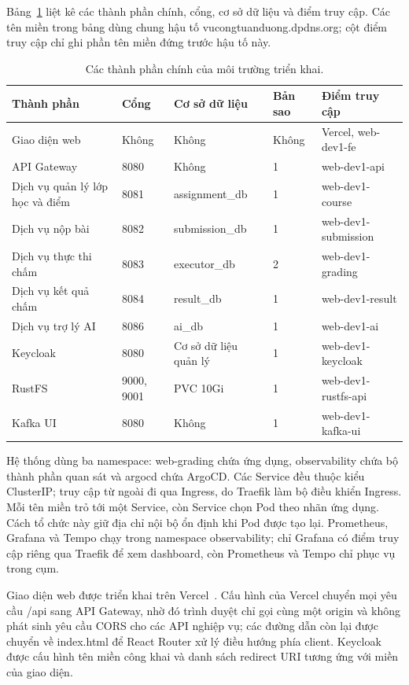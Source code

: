 \documentclass[../BTL.tex]{subfiles}
\begin{document}
Bảng~\ref{tab:deploy-components} liệt kê các thành phần chính, cổng, cơ sở dữ liệu và điểm truy cập. Các tên miền trong bảng dùng chung hậu tố vucongtuanduong.dpdns.org; cột điểm truy cập chỉ ghi phần tên miền đứng trước hậu tố này.

\begin{table}[H]
\centering
\footnotesize
\begin{tabularx}{\textwidth}{|p{3.1cm}|p{1.6cm}|p{3.2cm}|p{1.3cm}|X|}
\hline
Thành phần & Cổng & Cơ sở dữ liệu & Bản sao & Điểm truy cập \\ \hline
Giao diện web & Không & Không & Không & Vercel, web-dev1-fe \\ \hline
API Gateway & 8080 & Không & 1 & web-dev1-api \\ \hline
Dịch vụ quản lý lớp học và điểm & 8081 & assignment\_db & 1 & web-dev1-course \\ \hline
Dịch vụ nộp bài & 8082 & submission\_db & 1 & web-dev1-submission \\ \hline
Dịch vụ thực thi chấm & 8083 & executor\_db & 2 & web-dev1-grading \\ \hline
Dịch vụ kết quả chấm & 8084 & result\_db & 1 & web-dev1-result \\ \hline
Dịch vụ trợ lý AI & 8086 & ai\_db & 1 & web-dev1-ai \\ \hline
Keycloak & 8080 & Cơ sở dữ liệu quản lý & 1 & web-dev1-keycloak \\ \hline
RustFS & 9000, 9001 & PVC 10Gi & 1 & web-dev1-rustfs-api \\ \hline
Kafka UI & 8080 & Không & 1 & web-dev1-kafka-ui \\ \hline
\end{tabularx}
\caption{Các thành phần chính của môi trường triển khai.}
\label{tab:deploy-components}
\end{table}

Hệ thống dùng ba namespace: web-grading chứa ứng dụng, observability chứa bộ thành phần quan sát và argocd chứa ArgoCD. Các Service đều thuộc kiểu ClusterIP; truy cập từ ngoài đi qua Ingress, do Traefik làm bộ điều khiển Ingress. Mỗi tên miền trỏ tới một Service, còn Service chọn Pod theo nhãn ứng dụng. Cách tổ chức này giữ địa chỉ nội bộ ổn định khi Pod được tạo lại. Prometheus, Grafana và Tempo chạy trong namespace observability; chỉ Grafana có điểm truy cập riêng qua Traefik để xem dashboard, còn Prometheus và Tempo chỉ phục vụ trong cụm.

Giao diện web được triển khai trên Vercel~\cite{verceldocs}. Cấu hình của Vercel chuyển mọi yêu cầu /api sang API Gateway, nhờ đó trình duyệt chỉ gọi cùng một origin và không phát sinh yêu cầu CORS cho các API nghiệp vụ; các đường dẫn còn lại được chuyển về index.html để React Router xử lý điều hướng phía client. Keycloak được cấu hình tên miền công khai và danh sách redirect URI tương ứng với miền của giao diện.
\end{document}

